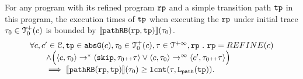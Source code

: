 \begin{lemma}
  For any program with its refined program $\mathtt{rp}$ and a simple transition path $\mathtt{tp}$ in this program,
  the execution times of $\mathtt{tp}$ when executing the $\mathtt{rp}$ under initial trace $\mathtt{\tau}_0 \in \mathcal{T}^{+}_0(c)$ is bounded by $\llbracket \mathtt{pathRB}(\mathtt{rp}, \mathtt{tp}) \rrbracket(\mathtt{\tau}_0)$.
  \[
    \begin{array}{l}
    \forall c, c' \in \mathcal{C}, \mathtt{tp} \in \mathtt{abs}{\mathtt{G}}(c), \mathtt{\tau}_0 \in \mathcal{T}^{+}_0(c), \mathtt{\tau} \in \mathcal{T}^{+\infty}, \mathtt{rp} ~.~ 
    \mathtt{rp} = REFINE(c)
    \\ \qquad
    \land
    \Big(
    \langle c, \mathtt{\tau}_0 \rangle \to^* \langle \mathtt{skip}, \mathtt{\tau}_0 {\scriptscriptstyle ++} \mathtt{\tau} \rangle
    \lor \langle c, \mathtt{\tau}_0 \rangle \to^\infty \langle c', \mathtt{\tau}_0 {\scriptscriptstyle ++} \mathtt{\tau} \rangle 
    \Big)
    \\ \qquad
    \implies
    \llbracket \mathtt{pathRB}(\mathtt{rp}, \mathtt{tp}) \rrbracket(\mathtt{\tau}_0) \geq \mathtt{lcnt}(\mathtt{\tau}, \mathtt{L}_{\mathtt{path}}(\mathtt{tp})).
    \end{array}
  \]
\end{lemma}
%
